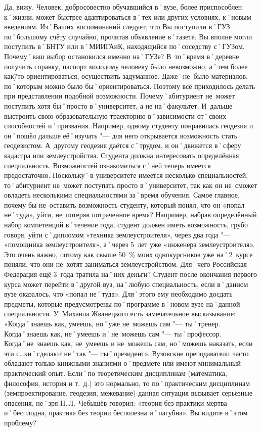 \begin{drama}
	\michaelspeaks Да, вижу. Человек, добросовестно обучавшийся в˚вузе, более приспособлен к˚жизни, может быстрее адаптироваться в˚тех или других условиях, к˚новым введениям.		
	\maxspeaks Из˚Ваших воспоминаний следует, что Вы поступили в˚ГУЗ по˚большому счёту случайно, прочитав объявление в˚газете. Вы вполне могли поступить в˚БНТУ или в˚МИИГАиК, находящийся по˚соседству с˚ГУЗом. Почему˚ваш выбор остановился именно на˚ГУЗе?
	\michaelspeaks В~то˚время в˚деревне получить справку, паспорт молодому человеку было невозможно, а˚тем более как\=/то ориентироваться, осуществить задуманное. Даже˚не~было материалов, по˚которым можно было бы˚ориентироваться. Поэтому всё приходилось делать при представлении подобной возможности.
	\maxspeaks Почему˚абитуриент не~может поступить хотя бы˚просто в˚университет, а не на˚факультет. И~дальше выстроить свою образовательную траекторию в˚зависимости от˚своих способностей и˚призвания. Например, одному студенту понравилась геодезия и он˚пошёл дальше её˚изучать "--- для него открывается возможность стать геодезистом. А~другому геодезия даётся с˚трудом, и он˚движется в˚сферу кадастра или землеустройства. 
	\michaelspeaks Студента должна интересовать определённая специальность. Возможностей ознакомиться с˚ней теперь имеется предостаточно. Поскольку˚в университете имеется несколько специальностей, то˚абитуриент не~может поступать просто в˚университет, так как он не~сможет овладеть несколькими специальностями за˚время обучения.
	\maxspeaks Самое главное, почему бы не~оставить возможность студенту, который понял, что он  «попал не˚туда», уйти, не~потеряв потраченное время? Например, набрав определённый набор компетенций в˚течение года, студент должен иметь возможность, грубо говоря, уйти с˚дипломом  «техника землеустроителя», через два года "---  «помощника землеустроителя», а˚через 5~лет уже  «инженера землеустроителя». Это очень важно, потому как свыше 50~\% моих однокурсников уже на˚2~курсе поняли, что они не~хотят заниматься землеустройством. Для˚чего Российская Федерация ещё 3~года тратила на˚них деньги?
	\michaelspeaks Студент после окончания первого курса может перейти в˚другой вуз, на˚любую специальность, если в˚данном вузе оказалось, что «попал не˚туда». Для˚этого ему необходимо досдать предметы, которые предусмотрены по˚программе в˚новом вузе на˚данной специальности.
	\maxspeaks У~Михаила Жванецкого есть замечательное высказывание:  «Когда˚знаешь как, умеешь, но˚уже не~можешь сам "--- ты˚тренер. Когда˚знаешь как, не˚умеешь и˚не~можешь сам "--- ты˚профессор. Когда˚не~знаешь как, не~умеешь и не~можешь сам, но˚можешь наказать, если эти с…ки˚сделают не˚так "--- ты˚президент». Вузовские преподаватели часто обладают только книжными знаниями о˚предмете или имеют минимальный практический опыт. Если˚по теоретическим дисциплинам (математика, философия, история и т.~д.) это нормально, то по˚практическим дисциплинам (земпроектирование, геодезия, межевание) данная ситуация вызывает серьёзные опасения, не˚зря П.\,Л.~Чебышёв говорил:  «теория без практики мертва и˚бесплодна, практика без теории бесполезна и˚пагубна». Вы видите в˚этом проблему?

\end{drama}
